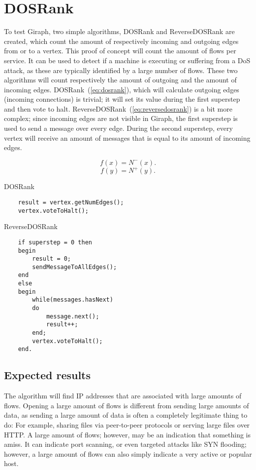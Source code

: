 \chapter{DOSRank}
\label{chp:dosrank}

To test Giraph, two simple algorithms, DOSRank and ReverseDOSRank are created, which count the amount of respectively incoming and outgoing edges from or to a vertex.
This proof of concept will count the amount of flows per \gls{service}.
It can be used to detect if a machine is executing or suffering from a \gls{DoS} attack,
 as these are typically identified by a large number of flows.
These two algorithms will count respectively the amount of outgoing and the amount of incoming edges.
DOSRank~(\ref{eq:dosrank}), which will calculate outgoing edges (incoming connections) is trivial; it will set its value during the first superstep and then vote to halt.
ReverseDOSRank~(\ref{eq:reversedosrank}) is a bit more complex;
 since incoming edges are not visible in Giraph, the first superstep is used to send a message over every edge.
During the second superstep, every vertex will receive an amount of messages that is equal to its amount of incoming edges.


\begin{equation}
	\label{eq:dosrank}
	f(x) = N^{-}(x).
\end{equation}
\begin{equation}
	\label{eq:reversedosrank}
	f(y) = N^{+}(y).
\end{equation}

\begin{algorithm}[h]
	\caption{DOSRank}
	\label{alg:dosrank}
	\begin{verbatim}
	result = vertex.getNumEdges();
	vertex.voteToHalt();
	\end{verbatim}
\end{algorithm}
\begin{algorithm}[h]
	\caption{ReverseDOSRank}
	\label{alg:reversedosrank}
	\begin{verbatim}
	if superstep = 0 then
	begin
	    result = 0;
	    sendMessageToAllEdges();
	end
	else
	begin
	    while(messages.hasNext)
	    do
	        message.next();
	        result++;
	    end;
	    vertex.voteToHalt();
	end.
	\end{verbatim}
\end{algorithm}

\section{Expected results}
The algorithm will find IP addresses that are associated with large amounts of flows.
Opening a large amount of flows is different from sending large amounts of data,
 as sending a large amount of data is often a completely legitimate thing to do:
For example, sharing files via peer-to-peer protocols or serving large files over HTTP.
A large amount of flows; however, may be an indication that something is amiss.
It can indicate port scanning, or even targeted attacks like SYN flooding;
however, a large amount of flows can also simply indicate a very active or popular host.

